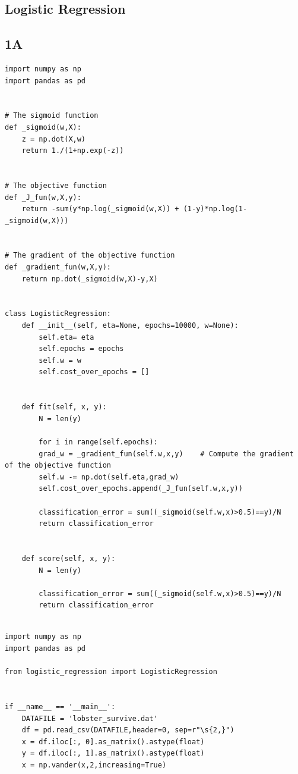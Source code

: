 \documentclass[12pt]{article}
\begin{document}
	\maketitle
	
	\begin{flushleft}
		\section{Logistic Regression}
		
		\subsection*{1A}
		\begin{lstlisting}
import numpy as np 
import pandas as pd


# The sigmoid function
def _sigmoid(w,X):
	z = np.dot(X,w)
	return 1./(1+np.exp(-z))


# The objective function
def _J_fun(w,X,y):
	return -sum(y*np.log(_sigmoid(w,X)) + (1-y)*np.log(1-_sigmoid(w,X)))


# The gradient of the objective function
def _gradient_fun(w,X,y):
	return np.dot(_sigmoid(w,X)-y,X)


class LogisticRegression:
	def __init__(self, eta=None, epochs=10000, w=None):
		self.eta= eta
		self.epochs = epochs
		self.w = w
		self.cost_over_epochs = []
	
	
	def fit(self, x, y):
		N = len(y)
		
		for i in range(self.epochs):
		grad_w = _gradient_fun(self.w,x,y)    # Compute the gradient of the objective function
		self.w -= np.dot(self.eta,grad_w)
		self.cost_over_epochs.append(_J_fun(self.w,x,y))
		
		classification_error = sum((_sigmoid(self.w,x)>0.5)==y)/N
		return classification_error
	
	
	def score(self, x, y):
		N = len(y)
		
		classification_error = sum((_sigmoid(self.w,x)>0.5)==y)/N
		return classification_error


		\end{lstlisting}
		\begin{lstlisting}
import numpy as np 
import pandas as pd

from logistic_regression import LogisticRegression


if __name__ == '__main__':
	DATAFILE = 'lobster_survive.dat'
	df = pd.read_csv(DATAFILE,header=0, sep=r"\s{2,}")
	x = df.iloc[:, 0].as_matrix().astype(float)
	y = df.iloc[:, 1].as_matrix().astype(float)
	x = np.vander(x,2,increasing=True)
	

\end{lstlisting}
\end{flushleft}
\end{document}
